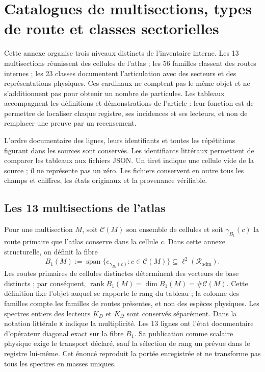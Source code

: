 \clearpage
\section{Catalogues de multisections, types de route et classes sectorielles}
\label{vi:sec:vi-catalogos-estructurales}

Cette annexe organise trois niveaux distincts de l'inventaire interne. Les
13 multisections réunissent des cellules de l'atlas ; les 56 familles classent des routes
internes ; les 23 classes documentent l'articulation avec des secteurs et des
représentations physiques. Ces cardinaux ne comptent pas le même objet et
ne s'additionnent pas pour obtenir un nombre de particules. Les tableaux accompagnent les
définitions et démonstrations de l'article : leur fonction est de permettre de localiser
chaque registre, ses incidences et ses lecteurs, et non de remplacer une preuve par un recensement.

L’ordre documentaire des lignes, leurs identifiants et toutes
les répétitions figurant dans les sources sont conservés. Les identifiants littéraux
permettent de comparer les tableaux aux fichiers JSON. Un tiret indique une cellule
vide de la source ; il ne représente pas un zéro. Les fichiers conservent en outre tous
les champs et chiffres, les états originaux et la provenance vérifiable.
\CatalogRouteReference

\subsection{Les 13 multisections de l’atlas}

Pour une multisection \(M\), soit \(\mathcal C(M)\) son ensemble de cellules et
soit \(\gamma_{B_1}(c)\) la route primaire que l’atlas conserve dans la cellule
\(c\). Dans cette annexe structurelle, on définit la fibre
\[
 B_1(M):=
 \operatorname{span}\bigl\{e_{\gamma_{B_1}(c)}:c\in\mathcal C(M)\bigr\}
 \subseteq \ell^2(\mathcal R_{\mathrm{adm}}).
\]
Les routes primaires de cellules distinctes déterminent des vecteurs de base distincts ;
par conséquent,
\(\operatorname{rank}B_1(M)=\dim B_1(M)=\#\mathcal C(M)\).
Cette définition fixe l'objet auquel se rapporte le rang du tableau ; la
colonne des familles compte les
familles de routes présentes, et non des espèces physiques. Les spectres entiers
des lecteurs \(K_D\) et \(K_\Omega\) sont conservés séparément.
Dans la notation littérale \texttt{x} indique la multiplicité. Les 13 lignes ont
l'état documentaire d'opérateur diagonal exact sur la fibre \(B_1\).
Sa publication comme scalaire physique exige le transport déclaré, sauf
la sélection de rang un prévue dans le registre lui-même. Cet énoncé
reproduit la portée enregistrée et ne transforme pas tous les spectres en masses uniques.

